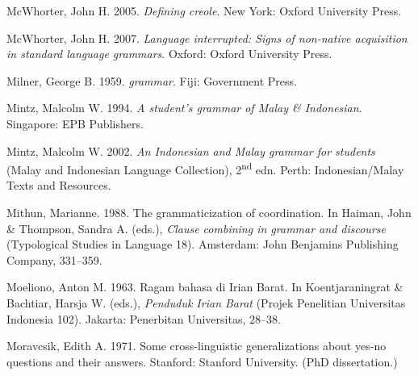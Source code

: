 \begin{styleCitaviBibliographyEntry}
McWhorter, John H. 2005. \textit{Defining creole}. New York: Oxford University Press.
\end{styleCitaviBibliographyEntry}

\begin{styleCitaviBibliographyEntry}
McWhorter, John H. 2007. \textit{Language interrupted: Signs of non-native acquisition in standard language grammars}. Oxford: Oxford University Press.
\end{styleCitaviBibliographyEntry}

\begin{styleCitaviBibliographyEntry}
Milner, George B. 1959. \textit{ grammar}. Fiji: Government Press.
\end{styleCitaviBibliographyEntry}

\begin{styleCitaviBibliographyEntry}
Mintz, Malcolm W. 1994. \textit{A student’s grammar of Malay \& Indonesian}. Singapore: EPB Publishers.
\end{styleCitaviBibliographyEntry}

\begin{styleCitaviBibliographyEntry}
Mintz, Malcolm W. 2002. \textit{An Indonesian and Malay grammar for students} (Malay and Indonesian Language Collection), 2\textsuperscript{nd} edn. Perth: Indonesian/Malay Texts and Resources.
\end{styleCitaviBibliographyEntry}

\begin{styleCitaviBibliographyEntry}
Mithun, Marianne. 1988. The grammaticization of coordination. In Haiman, John \& Thompson, Sandra A. (eds.), \textit{Clause combining in grammar and discourse} (Typological Studies in Language 18). Amsterdam: John Benjamins Publishing Company, 331–359.
\end{styleCitaviBibliographyEntry}

\begin{styleCitaviBibliographyEntry}
Moeliono, Anton M. 1963. Ragam bahasa di Irian Barat. In Koentjaraningrat \& Bachtiar, Harsja W. (eds.), \textit{Penduduk Irian Barat} (Projek Penelitian Universitas Indonesia 102). Jakarta: Penerbitan Universitas, 28–38.
\end{styleCitaviBibliographyEntry}

\begin{styleCitaviBibliographyEntry}
Moravcsik, Edith A. 1971. Some cross-linguistic generalizations about yes-no questions and their answers. Stanford: Stanford University. (PhD dissertation.)
\end{styleCitaviBibliographyEntry}

